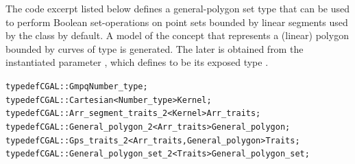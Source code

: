 The code excerpt listed below defines a general-polygon set type that
can be used to perform Boolean set-operations on point sets bounded by
linear segments used by the  class by default. A
model of the  concept that represents a
(linear) polygon bounded by curves of type  is
generated. The later is obtained from the instantiated parameter
, which defines  to be
its exposed type .
\begin{alltt}
typedef CGAL::Gmpq                                      Number_type;
typedef CGAL::Cartesian<Number_type>                    Kernel;
typedef CGAL::Arr_segment_traits_2<Kernel>              Arr_traits;
typedef CGAL::General_polygon_2<Arr_traits>             General_polygon;
typedef CGAL::Gps_traits_2<Arr_traits,General_polygon>  Traits;
typedef CGAL::General_polygon_set_2<Traits>             General_polygon_set;
\end{alltt}

